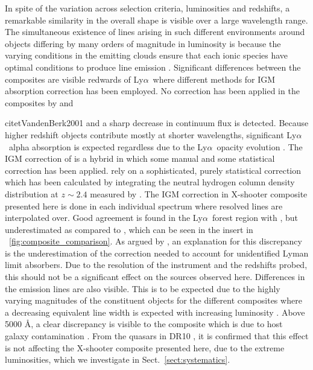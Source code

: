 \documentclass{aa}    %
\newcommand{\figref}[1]{\ref{fig:#1}}
\newcommand{\Fig}[1]{\figurename~\figref{#1}}
\newcommand{\fig}[1]{\Fig{#1}}
\newcommand{\sectionname}{Sect.}
\newcommand{\Sect}[1]{\sectionname~\ref{sect:#1}}
\newcommand{\sect}[1]{\Sect{#1}}
\newcommand{\lya}{Ly$\alpha$}
\begin{document}
In spite of the variation across selection criteria, luminosities and redshifts, a remarkable similarity in the overall shape is visible over a large wavelength range. The simultaneous existence of lines arising in such different environments around objects differing by many orders of magnitude in luminosity is because the varying conditions in the emitting clouds ensure that each ionic species have optimal conditions to produce line emission \citep{Baldwin1995}.  Significant differences between the composites are visible redwards of \lya~where different methods for IGM absorption correction has been employed. No correction has been applied in the composites by \citet{Francis1991} and {citet{VandenBerk2001} and a sharp decrease in continuum flux is detected. Because higher redshift objects contribute mostly at shorter wavelengths, significant \lya~alpha absorption is expected regardless due to the \lya~opacity evolution \citep{Moller1990, Madau1995, DallAglio2008}. The IGM correction of \citet{Telfer2002} is a hybrid in which some manual and some statistical correction has been applied. \citet{Lusso2015} rely on a sophisticated, purely statistical correction which has been calculated by integrating the neutral hydrogen column density distribution at $z \sim 2.4$ measured by \cite{Prochaska2014b}. The IGM correction in X-shooter composite presented here is done in each individual spectrum where resolved lines are interpolated over. Good agreement is found in the \lya~forest region with \cite{Telfer2002}, but underestimated as compared to \cite{Lusso2015}, which can be seen in the insert in \fig{composite_comparison}. As argued by \cite{Lusso2015}, an explanation for this discrepancy is the underestimation of the correction needed to account for unidentified Lyman limit absorbers. Due to the resolution of the instrument and the redshifts probed, this should not be a significant effect on the sources observed here. 
Differences in the emission lines are also visible. This is to be expected due to the highly varying magnitudes of the constituent objects for the different composites where a decreasing equivalent line width is expected with increasing luminosity \citep{Baldwin1977}. 
Above 5000 \AA, a clear discrepancy is visible to the \citet{VandenBerk2001} composite which is due to host galaxy contamination \citep{Glikman2006}. 
From the quasars in DR10 \citep{Shen2011}, it is confirmed that this effect is not affecting the X-shooter composite presented here, due to the extreme luminosities, which we investigate in \sect{systematics}.


}
\end{document}
